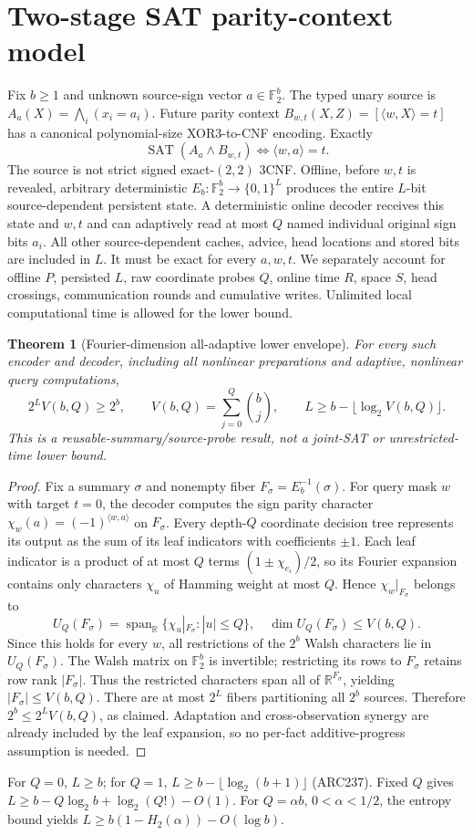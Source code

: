 \documentclass[10pt]{article}
\newtheorem{theorem}{Theorem}
\newcommand{\F}{\mathbb F_2}
\begin{document}
\section{Two-stage SAT parity-context model}
Fix $b\ge1$ and unknown source-sign vector $a\in\F^b$. The typed unary source is $A_a(X)=\bigwedge_i(x_i=a_i)$. Future parity context $B_{w,t}(X,Z)=[\langle w,X\rangle=t]$ has a canonical polynomial-size XOR3-to-CNF encoding. Exactly
\[
 \operatorname{SAT}(A_a\land B_{w,t})\iff\langle w,a\rangle=t.
\]
The source is not strict signed exact-$(2,2)$ 3CNF. Offline, before $w,t$ is revealed, arbitrary deterministic $E_b:\F^b\to\{0,1\}^L$ produces the entire $L$-bit source-dependent persistent state. A deterministic online decoder receives this state and $w,t$ and can adaptively read at most $Q$ named individual original sign bits $a_i$. All other source-dependent caches, advice, head locations and stored bits are included in $L$. It must be exact for every $a,w,t$. We separately account for offline $P$, persisted $L$, raw coordinate probes $Q$, online time $R$, space $S$, head crossings, communication rounds and cumulative writes. Unlimited local computational time is allowed for the lower bound.
\begin{theorem}[Fourier-dimension all-adaptive lower envelope]
For every such encoder and decoder, including all nonlinear preparations and adaptive, nonlinear query computations,
\[
 \boxed{2^L V(b,Q)\ge2^b},\qquad
 V(b,Q)=\sum_{j=0}^{Q}\binom bj,\qquad
 \boxed{L\ge b-\lfloor\log_2 V(b,Q)\rfloor}.
\]
This is a reusable-summary/source-probe result, not a joint-SAT or unrestricted-time lower bound.
\end{theorem}
\begin{proof}
Fix a summary $\sigma$ and nonempty fiber $F_\sigma=E_b^{-1}(\sigma)$. For query mask $w$ with target $t=0$, the decoder computes the sign parity character $\chi_w(a)=(-1)^{\langle w,a\rangle}$ on $F_\sigma$. Every depth-$Q$ coordinate decision tree represents its output as the sum of its leaf indicators with coefficients $\pm1$. Each leaf indicator is a product of at most $Q$ terms $(1\pm\chi_{e_i})/2$, so its Fourier expansion contains only characters $\chi_u$ of Hamming weight at most $Q$. Hence $\chi_w|_{F_\sigma}$ belongs to
\[
 U_Q(F_\sigma)=\operatorname{span}_{\mathbb R}\{\chi_u|_{F_\sigma}:|u|\le Q\},\quad
 \dim U_Q(F_\sigma)\le V(b,Q).
\]
Since this holds for every $w$, all restrictions of the $2^b$ Walsh characters lie in $U_Q(F_\sigma)$. The Walsh matrix on $\F^b$ is invertible; restricting its rows to $F_\sigma$ retains row rank $|F_\sigma|$. Thus the restricted characters span all of $\mathbb R^{F_\sigma}$, yielding $|F_\sigma|\le V(b,Q)$. There are at most $2^L$ fibers partitioning all $2^b$ sources. Therefore $2^b\le2^L V(b,Q)$, as claimed. Adaptation and cross-observation synergy are already included by the leaf expansion, so no per-fact additive-progress assumption is needed.
\end{proof}
For $Q=0$, $L\ge b$; for $Q=1$, $L\ge b-\lfloor\log_2(b+1)\rfloor$ (ARC237). Fixed $Q$ gives $L\ge b-Q\log_2b+\log_2(Q!)-O(1)$. For $Q=\alpha b$, $0<\alpha<1/2$, the entropy bound yields $L\ge b(1-H_2(\alpha))-O(\log b)$.
\end{document}
